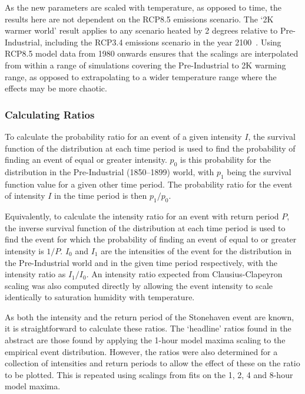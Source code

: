 As the new parameters are scaled with temperature,
    as opposed to time,
    the results here are not dependent on the RCP8.5 emissions scenario.
The `2K warmer world' result applies to any scenario heated by 2 degrees relative to Pre-Industrial,
    including the RCP3.4 emissions scenario in the year 2100~\cite{Pielke_2021}.
Using RCP8.5 model data from 1980 onwards ensures that the scalings are interpolated from within a range of simulations
    covering the Pre-Industrial to 2K warming range,
    as opposed to extrapolating to a wider temperature range where the effects may be more chaotic.

\subsubsection{Calculating Ratios}

To calculate the probability ratio for an event of a given intensity $I$,
    the survival function of the distribution at each time period is used to find the probability of finding an event of equal or greater intensity.
$p_0$ is this probability for the distribution in the Pre-Industrial (1850--1899) world,
    with $p_1$ being the survival function value for a given other time period.
The probability ratio for the event of intensity $I$ in the time period is then $p_1/p_0$.

Equivalently, to calculate the intensity ratio for an event with return period $P$,
    the inverse survival function of the distribution at each time period is used to find the event for which the probability of finding an event of equal to or greater intensity is $1/P$.
$I_0$ and $I_1$ are the intensities of the event for the distribution in the Pre-Industrial world and in the given time period respectively,
    with the intensity ratio as $I_1/I_0$.
An intensity ratio expected from Clausius-Clapeyron scaling was also computed directly by allowing the event intensity to scale identically to saturation humidity with temperature.

As both the intensity and the return period of the Stonehaven event are known,
    it is straightforward to calculate these ratios.
The `headline' ratios found in the abstract are those found by applying the 1-hour model maxima scaling to the empirical event distribution.
However, the ratios were also determined for a collection of intensities and return periods to allow the effect of these on the ratio to be plotted.
This is repeated using scalings from fits  on the 1, 2, 4 and 8-hour model maxima.

